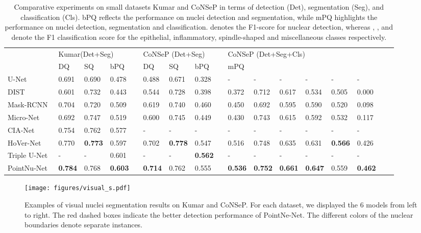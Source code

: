 \documentclass[lettersize,journal]{IEEEtran}
\begin{document}
\begin{table*}[ht]\footnotesize
\centering
\caption{Comparative experiments on small datasets Kumar and CoNSeP in terms of detection (Det), segmentation (Seg), and classification (Cls). bPQ reflects the performance on nuclei detection and segmentation, while mPQ highlights the performance on nuclei detection, segmentation and classification.  denotes the F1-score for nuclear detection, whereas , ,  and  denote the F1 classification score for the epithelial, inflammatory, spindle-shaped and miscellaneous classes respectively.}
\begin{tabular}{lllllllllllllllll}
\toprule
   & \multicolumn{3}{l}{Kumar(Det+Seg)} &  & \multicolumn{3}{l}{CoNSeP (Det+Seg)} &  & \multicolumn{6}{l}{CoNSeP (Det+Seg+Cls)}    \\ \cmidrule{2-4} \cmidrule{6-8} \cmidrule{10-15}
   & DQ & SQ & bPQ &  &  DQ & SQ & bPQ && mPQ &  &  &  &  & \rm{}  \\ \midrule
U-Net~\cite{unet} &0.691&0.690&0.478&&0.488&0.671&0.328& & -  &-&-&-&-&-\\
DIST~\cite{dist}  & 0.601 & 0.732 & 0.443 &  &  0.544 & 0.728 & 0.398 && 0.372  & 0.712 & 0.617 & 0.534 & 0.505 & 0.000\\
Mask-RCNN~\cite{maskrcnn}  & 0.704 & 0.720 & 0.509 &  &  0.619 & 0.740 & 0.460 &&0.450   & 0.692 & 0.595 & 0.590 & 0.520 & 0.098\\
Micro-Net~\cite{micronet}   & 0.692 & 0.747 & 0.519 &   & 0.600 & 0.745 & 0.449 && 0.430 & 0.743 & 0.615 & 0.592 & 0.532 & 0.117 \\
CIA-Net~\cite{cianet}   & 0.754 & 0.762 & 0.577 &   & - & - & -& &-   &-&-&-&-&-\\
HoVer-Net~\cite{hovernet}   & 0.770 & \textbf{0.773} & 0.597 &   & 0.702 & \textbf{0.778} & 0.547 && 0.516 & 0.748 & 0.635 & 0.631 & \textbf{0.566} & 0.426 \\
Triple U-Net~\cite{tripleunet}	 & - & - & 0.601 &  & - & - & \textbf{0.562} &&- &-&-&-&-&-\\
PointNu-Net   & \textbf{0.784} & 0.768 & \textbf{0.603} &  & \textbf{0.714} & 0.762 & 0.555 && \textbf{0.536} & \textbf{0.752} & \textbf{0.661} & \textbf{0.647} & 0.559 & \textbf{0.462} \\ \bottomrule
\end{tabular}
\label{tab:kumar}
\end{table*}


\begin{figure*}[ht] 
\centering
\texttt{[image: figures/visual\_s.pdf]}
\caption{Examples of visual nuclei segmentation results on Kumar and CoNSeP. For each dataset, we displayed the 6 models from left to right. The red dashed boxes indicate the better detection performance of PointNe-Net. The different colors of the nuclear boundaries denote separate instances. }
\label{fig:visual1}
\end{figure*}
\end{document}
